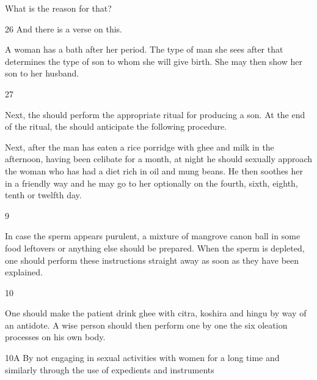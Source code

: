 \begin{translation}
    What is the reason for that?
     
     
     \item[26]
     And there is a verse on this.
     
     \begin{sloka}
         
         A woman has a bath after her period.  The type of man she sees after 
         that determines the type of son to whom she will give birth. She may then 
         show her son to her husband.     
           
     \end{sloka}
        
        \item[27]
        
        Next, the  should perform the appropriate ritual 
        for producing a son.  At the end of the ritual, the  
        should anticipate the following procedure. 
        
        Next, after the man has eaten a rice porridge with ghee and milk in the
afternoon, having been celibate for a month, at night he should sexually
approach the woman who has had a diet rich in oil and mung beans.  He then
soothes her in a friendly way and he may go to her optionally on the fourth, 
sixth, eighth, tenth or twelfth day. 
        
        
        
  

\newpage
  \begin{tt}
     \bigskip
     \raggedright

 
 \item[9]
 
  In case the sperm appears purulent, a mixture of mangrove canon ball in some 
  food leftovers or anything else should be prepared. When the sperm is 
  depleted, one should perform these instructions straight away as soon as they 
  have been explained.
 
 \item[10]
 
  One should make the patient drink ghee with citra, koshira and hingu by way of 
  an antidote. A wise person should then perform one by one the six oleation 
  processes on his own body.
  
  
  
\item[10A]  By not engaging in sexual activities with women for a long time and 
similarly 
  through the use of expedients and instruments
  

\end{tt}
\end{translation}

